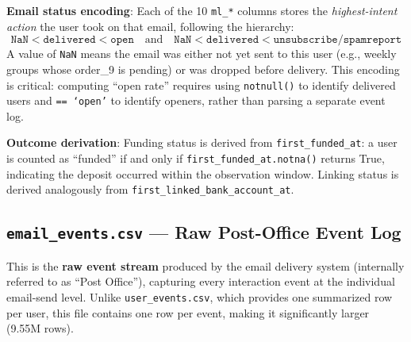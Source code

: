\documentclass[12pt,a4paper]{article}
\begin{document}
\textbf{Email status encoding}: Each of the 10 \texttt{ml\_*} columns stores the
\textit{highest-intent action} the user took on that email, following the hierarchy:
\begin{equation*}
  \texttt{NaN} < \texttt{delivered} < \texttt{open} \quad
  \text{and} \quad
  \texttt{NaN} < \texttt{delivered} < \texttt{unsubscribe} / \texttt{spamreport}
\end{equation*}
A value of \texttt{NaN} means the email was either not yet sent to this user (e.g.,
weekly groups whose order\_9 is pending) or was dropped before delivery. This
encoding is critical: computing ``open rate'' requires using \texttt{notnull()} to
identify delivered users and \texttt{== `open'} to identify openers, rather than
parsing a separate event log.

\textbf{Outcome derivation}: Funding status is derived from \texttt{first\_funded\_at}:
a user is counted as ``funded'' if and only if
\texttt{first\_funded\_at.notna()} returns True, indicating the deposit occurred
within the observation window. Linking status is derived analogously from
\texttt{first\_linked\_bank\_account\_at}.

\subsection{\texttt{email\_events.csv} — Raw Post-Office Event Log}

This is the \textbf{raw event stream} produced by the email delivery system
(internally referred to as ``Post Office''), capturing every interaction event
at the individual email-send level. Unlike \texttt{user\_events.csv}, which
provides one summarized row per user, this file contains one row per event,
making it significantly larger (9.55M rows).
\end{document}
